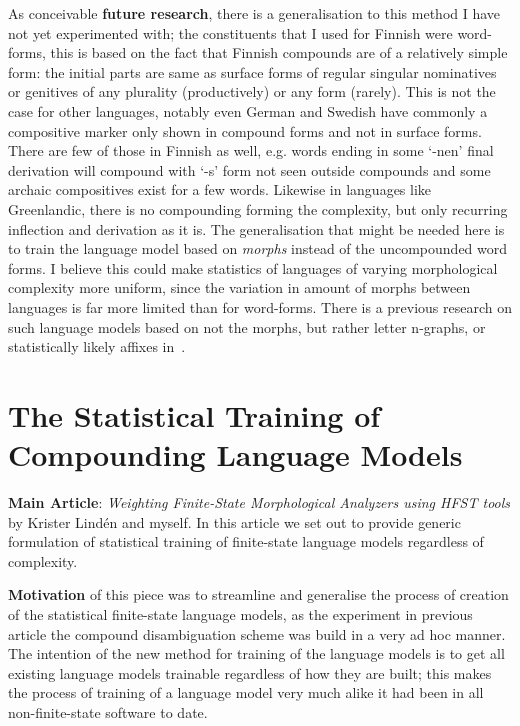 \documentclass[officiallayout]{unihelcompling}
\begin{document}
As conceivable \textbf{future research}, there is a generalisation to this
method I have not yet experimented with; the constituents that I used for
Finnish were word-forms, this is based on the fact that Finnish compounds are
of a relatively simple form: the initial parts are same as surface forms of
regular singular nominatives or genitives of any plurality (productively) or
any form (rarely). This is not the case for other languages, notably even
German and Swedish have commonly a compositive marker only shown in compound
forms and not in surface forms. There are few of those in Finnish as well,
e.g.\/ words ending in some `-nen' final derivation will compound with `-s'
form not seen outside compounds and some archaic compositives exist for a few
words.  Likewise in languages like Greenlandic, there is no compounding forming
the complexity, but only recurring inflection and derivation as it is. The
generalisation that might be needed here is to train the language model based
on \emph{morphs} instead of the uncompounded word forms.  I believe this could
make statistics of languages of varying morphological complexity more uniform,
since the variation in amount of morphs between languages is far more limited
than for word-forms. There is a previous research on such language models based
on not the morphs, but rather letter n-graphs, or statistically likely affixes
in~\citet{creutz2005morfessor}.

\section{The Statistical Training of Compounding Language Models}
\label{sec:training-compounds}

\textbf{Main Article}: \emph{Weighting Finite-State Morphological Analyzers
using HFST tools} by Krister Lindén and myself. In this article we set out
to provide generic formulation of statistical training of finite-state
language models regardless of complexity.

\textbf{Motivation} of this piece was to streamline and generalise the process
of creation of the statistical finite-state language models, as the experiment
in previous article  the compound
disambiguation scheme was build in a very ad hoc manner. The intention of the
new method for training of the language models is to get all existing language
models trainable regardless of how they are built; this makes the process of
training of a language model very much alike it had been in all
non-finite-state software to date.
\end{document}

